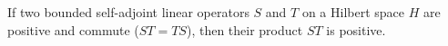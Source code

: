 \begin{theorem}
    If two bounded self-adjoint linear operators \( S  \) and \( T  \) on a Hilbert space \( H  \) are positive and commute (\( ST  = TS \)), then their product \( S T  \) is positive.
\end{theorem}


